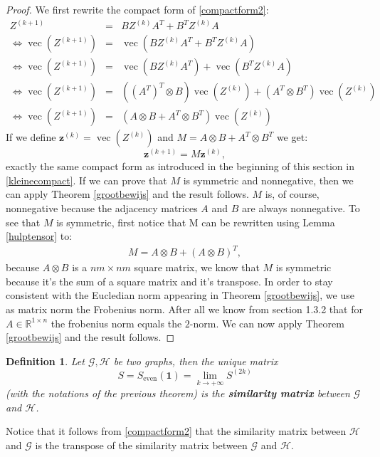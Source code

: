 \documentclass[a4paper,11pt]{report}
\newtheorem{definition}[theorem]{Definition}
\newcommand{\R}{{\mathbb R}}
\newcommand{\graf}{\mathscr{G}}
\newcommand{\grafeen}{\mathscr{H}}
\newcommand{\vect}{\operatorname{vec}}
\begin{document}
\begin{proof}
  We first rewrite the compact form of \ref{compactform2}:
  \begin{eqnarray*}
    Z^{(k+1)} &=& BZ^{(k)}A^T + B^TZ^{(k)}A\\
 \Leftrightarrow   \vect(Z^{(k+1)}) &=& \vect(BZ^{(k)}A^T + B^TZ^{(k)}A)\\
 \Leftrightarrow   \vect(Z^{(k+1)}) &=& \vect(BZ^{(k)}A^T) + \vect(B^TZ^{(k)}A)\\
 \Leftrightarrow   \vect(Z^{(k+1)}) &=& \left( (A^T)^T \otimes B\right)\vect(Z^{(k)}) + \left( A^T \otimes B^T\right)\vect(Z^{(k)})\\
  \Leftrightarrow  \vect(Z^{(k+1)}) &=& (A \otimes B + A^T \otimes B^T)\vect(Z^{(k)})
  \end{eqnarray*}
If we define $\mathbf{z}^{(k)} = \vect(Z^{(k)})$ and $M = A \otimes B + A^T \otimes 
B^T$ we get:
$$\mathbf{z}^{(k+1)} = M\mathbf{z}^{(k)},$$
exactly the same compact form as introduced in the beginning of this section in 
\ref{kleinecompact}. If we can prove that $M$ is symmetric and nonnegative, then
we can apply Theorem \ref{grootbewijs} and the result follows. $M$ is, of 
course, nonnegative because the adjacency matrices $A$ and $B$ are always 
nonnegative. To see that $M$ is symmetric, first notice that M can be rewritten 
using Lemma \ref{hulptensor} to:
\begin{eqnarray}\label{uitgeschrevenvectornormaal}
M = A \otimes B + (A \otimes  B)^T,
\end{eqnarray}
because $A \otimes B$ is a $nm \times nm$ square matrix, we know that $M$ is 
symmetric because it's the sum of a square matrix and it's transpose. In order 
to stay consistent with the Eucledian norm appearing in Theorem \ref{grootbewijs}, we use as matrix norm
the Frobenius norm. After all we know from section 1.3.2 that for $A \in \R^{1\times n}$ the frobenius norm equals the
$2$-norm. 
We can now apply Theorem \ref{grootbewijs} and the result follows.
\end{proof}
\begin{definition}
  Let $\graf, \grafeen$ be two graphs, then the unique matrix
   $$S = S_\text{even}(\mathbf{1}) = \lim_{k\to +\infty} S^{(2k)}$$ 
 (with the notations of the previous theorem) is the \textbf{similarity matrix} between $\graf$ and
   $\grafeen$.
\end{definition}
Notice that it follows from \ref{compactform2} that the similarity matrix 
between $\grafeen$ and $\graf$ is the transpose of the similarity matrix between 
$\graf$ and $\grafeen$.
\end{document}
